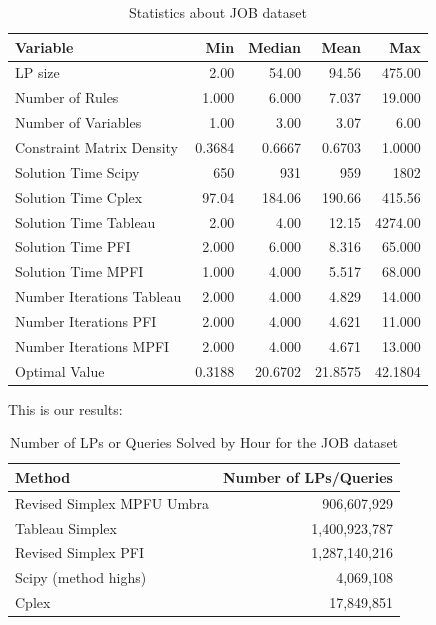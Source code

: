 \begin{table}[!htb]
    \centering
    \caption{Statistics about JOB dataset}
    \begin{tabular}{lrrrr}
        \toprule
        Variable                  & Min    & Median  & Mean    & Max     \\
        \midrule
        LP size                   & 2.00   & 54.00   & 94.56   & 475.00  \\
        Number of Rules           & 1.000  & 6.000   & 7.037   & 19.000  \\
        Number of Variables       & 1.00   & 3.00    & 3.07    & 6.00    \\
        Constraint Matrix Density & 0.3684 & 0.6667  & 0.6703  & 1.0000  \\
        Solution Time Scipy       & 650    & 931     & 959     & 1802    \\
        Solution Time Cplex       & 97.04  & 184.06  & 190.66  & 415.56  \\
        Solution Time Tableau     & 2.00   & 4.00    & 12.15   & 4274.00 \\
        Solution Time PFI         & 2.000  & 6.000   & 8.316   & 65.000  \\
        Solution Time MPFI        & 1.000  & 4.000   & 5.517   & 68.000  \\
        Number Iterations Tableau & 2.000  & 4.000   & 4.829   & 14.000  \\
        Number Iterations PFI     & 2.000  & 4.000   & 4.621   & 11.000  \\
        Number Iterations MPFI    & 2.000  & 4.000   & 4.671   & 13.000  \\
        Optimal Value             & 0.3188 & 20.6702 & 21.8575 & 42.1804 \\
        \bottomrule
    \end{tabular}
    \label{table_job_stats}
\end{table} 

This is our results:
\begin{table}[!htb]
    \centering
    \caption{Number of LPs or Queries Solved by Hour for the JOB dataset}
    \begin{tabular}{l|r}
        \toprule
        Method                     & Number of LPs/Queries \\
        \midrule
        Revised Simplex MPFU Umbra & 906,607,929           \\
        Tableau Simplex            & 1,400,923,787         \\
        Revised Simplex PFI        & 1,287,140,216         \\
        Scipy (method highs)       & 4,069,108             \\
        Cplex                      & 17,849,851            \\
        \bottomrule
    \end{tabular}
    \label{table_lps_hr_job}
\end{table} 



